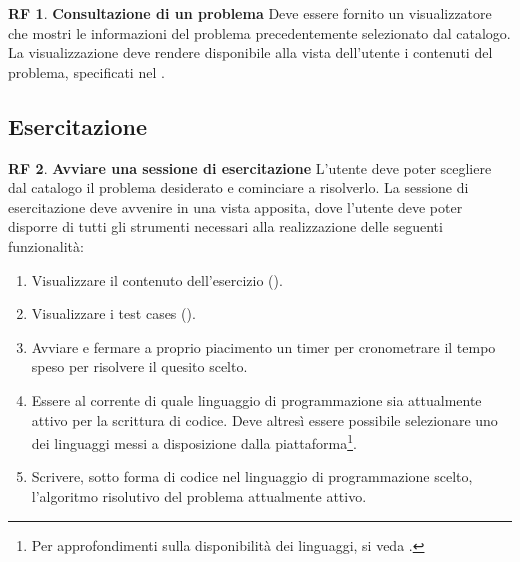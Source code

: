 \documentclass[11pt, a4paper]{article}
\theoremstyle{definition}
\newtheorem{funcreq}{RF} %
\begin{document}
\begin{funcreq}
\label{seeproblem}
\textbf{Consultazione di un problema }
Deve essere fornito un visualizzatore che mostri le informazioni del
problema precedentemente selezionato dal catalogo. La visualizzazione
deve rendere disponibile alla vista dell'utente i contenuti del
problema, specificati nel \textcolor{blue}{}.
\end{funcreq}

\subsection{Esercitazione}
\begin{funcreq}
\label{exesession}
\textbf{Avviare una sessione di esercitazione }
L'utente deve poter scegliere dal catalogo il problema desiderato e cominciare
a risolverlo. La sessione di esercitazione deve avvenire in una vista apposita, dove
l'utente deve poter disporre di tutti gli strumenti necessari alla realizzazione
delle seguenti funzionalità:
\begin{enumerate}
    \item Visualizzare il contenuto dell'esercizio (\textcolor{blue}{}).
    
    \item Visualizzare i test cases (\textcolor{blue}{}).

    \item Avviare e fermare a proprio piacimento un timer per cronometrare
    il tempo speso per risolvere il quesito scelto.
    
    \item Essere al corrente di quale linguaggio di programmazione sia
    attualmente attivo per la scrittura di codice. Deve altresì essere 
    possibile selezionare uno dei linguaggi messi a disposizione dalla
    piattaforma\footnote{Per approfondimenti sulla disponibilità dei
    linguaggi, si veda \textcolor{blue}{}.}.

    
    \item Scrivere, sotto forma di codice nel linguaggio di programmazione
    scelto, l'algoritmo risolutivo del problema attualmente attivo.
\end{enumerate}
\end{funcreq}
\end{document}
